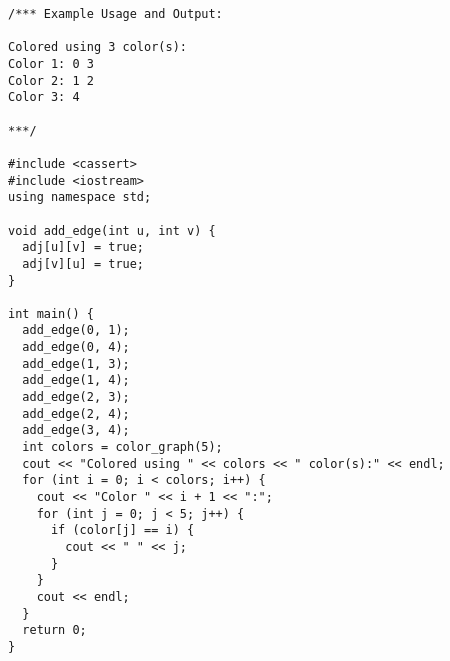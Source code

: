 \begin{lstlisting}
/*** Example Usage and Output:

Colored using 3 color(s):
Color 1: 0 3
Color 2: 1 2
Color 3: 4

***/

#include <cassert>
#include <iostream>
using namespace std;

void add_edge(int u, int v) {
  adj[u][v] = true;
  adj[v][u] = true;
}

int main() {
  add_edge(0, 1);
  add_edge(0, 4);
  add_edge(1, 3);
  add_edge(1, 4);
  add_edge(2, 3);
  add_edge(2, 4);
  add_edge(3, 4);
  int colors = color_graph(5);
  cout << "Colored using " << colors << " color(s):" << endl;
  for (int i = 0; i < colors; i++) {
    cout << "Color " << i + 1 << ":";
    for (int j = 0; j < 5; j++) {
      if (color[j] == i) {
        cout << " " << j;
      }
    }
    cout << endl;
  }
  return 0;
}
\end{lstlisting}
